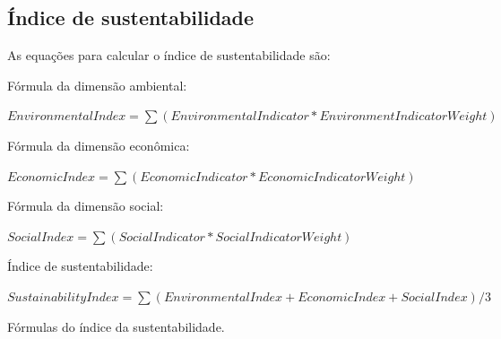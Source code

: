 \subsection*{Índice de sustentabilidade}

As equações para calcular o índice de sustentabilidade são:

\begin{algorithm}[H]
Fórmula da dimensão ambiental:

$EnvironmentalIndex=\sum(EnvironmentalIndicator*EnvironmentIndicatorWeight)$

Fórmula da dimensão econômica:

$EconomicIndex=\sum(EconomicIndicator*EconomicIndicatorWeight)$

Fórmula da dimensão social:

$SocialIndex=\sum(SocialIndicator*SocialIndicatorWeight)$

Índice de sustentabilidade:

$SustainabilityIndex=\sum(EnvironmentalIndex+EconomicIndex+SocialIndex)/3$

\caption{Fórmulas do índice da sustentabilidade.}
\end{algorithm}


